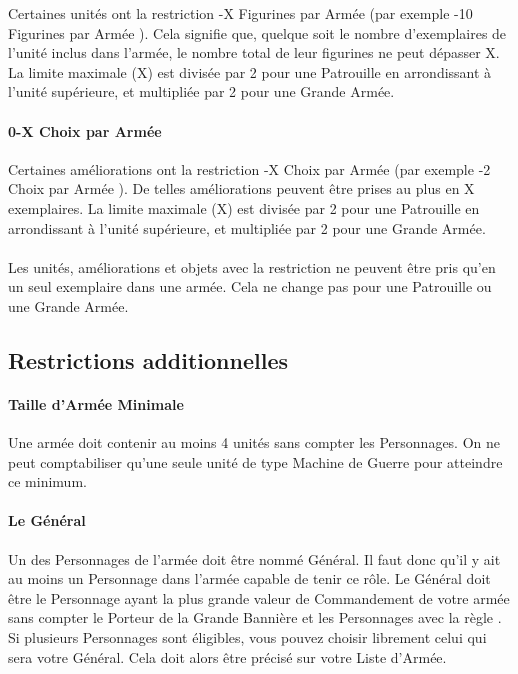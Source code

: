 Certaines unités ont la restriction -X Figurines par Armée \fg{} (par exemple -10 Figurines par Armée \fg{}). Cela signifie que, quelque soit le nombre d'exemplaires de l'unité inclus dans l'armée, le nombre total de leur figurines ne peut dépasser X. La limite maximale (X) est divisée par 2 pour une Patrouille en arrondissant à l'unité supérieure, et multipliée par 2 pour une Grande Armée.

\paragraph{0-X Choix par Armée}

Certaines améliorations ont la restriction -X Choix par Armée \fg{} (par exemple -2 Choix par Armée \fg{}). De telles améliorations peuvent être prises au plus en X exemplaires. La limite maximale (X) est divisée par 2 pour une Patrouille en arrondissant à l'unité supérieure, et multipliée par 2 pour une Grande Armée.

\paragraph{\oneperarmy}

Les unités, améliorations et objets avec la restriction \og \oneperarmy{} \fg{} ne peuvent être pris qu'en un seul exemplaire dans une armée. Cela ne change pas pour une Patrouille ou une Grande Armée.

\subsection{Restrictions additionnelles}

\paragraph{Taille d'Armée Minimale}

Une armée doit contenir au moins 4 unités sans compter les Personnages. On ne peut comptabiliser qu'une seule unité de type Machine de Guerre pour atteindre ce minimum.

\paragraph{Le Général}

Un des Personnages de l'armée doit être nommé Général. Il faut donc qu'il y ait au moins un Personnage dans l'armée capable de tenir ce rôle. Le Général doit être le Personnage ayant la plus grande valeur de Commandement de votre armée sans compter le Porteur de la Grande Bannière et les Personnages avec la règle \notaleader{}. Si plusieurs Personnages sont éligibles, vous pouvez choisir librement celui qui sera votre Général. Cela doit alors être précisé sur votre Liste d'Armée.

